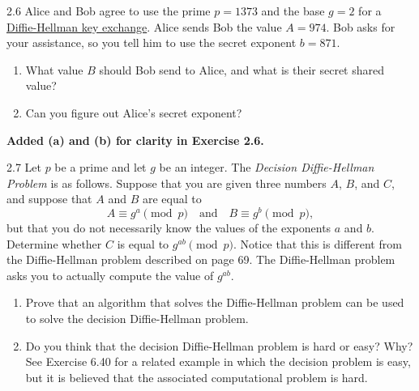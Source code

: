 
\begin{exercise}
    {2.6} Alice and Bob agree to use the prime $p = 1373$ and the base $g = 2$ for a \hyperlink{d-h key}{Diffie-Hellman key exchange}. Alice sends Bob the value $A = 974$. Bob asks for your assistance, so you tell him to use the secret exponent $b = 871$.
    \begin{enumerate}
        \item What value $B$ should Bob send to Alice, and what is their secret shared value?
        \item Can you figure out Alice's secret exponent?
    \end{enumerate}
\end{exercise}

\begin{center}
    \textbf{Added (a) and (b) for clarity in Exercise 2.6.}
\end{center}


\begin{exercise}
    {2.7} Let $p$ be a prime and let $g$ be an integer. The \textit{Decision Diffie-Hellman Problem} is as follows. Suppose that you are given three numbers $A$, $B$, and $C$, and suppose that $A$ and $B$ are equal to
    \[
        A \equiv g^a \pmod{p} \quad \text{and} \quad B \equiv g^b \pmod{p},
    \]
    but that you do not necessarily know the values of the exponents $a$ and $b$. Determine whether $C$ is equal to $g^{ab} \pmod{p}$. Notice that this is different from the Diffie-Hellman problem described on page 69. The Diffie-Hellman problem asks you to actually compute the value of $g^{ab}$.
    \begin{enumerate}
        \item Prove that an algorithm that solves the Diffie-Hellman problem can be used to solve the decision Diffie-Hellman problem.
        \item Do you think that the decision Diffie-Hellman problem is hard or easy? Why? See Exercise 6.40 for a related example in which the decision problem is easy, but it is believed that the associated computational problem is hard.
    \end{enumerate}
\end{exercise}

